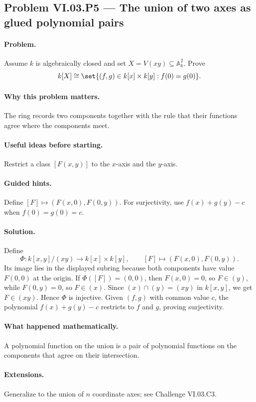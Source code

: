 \subsection*{Problem VI.03.P5 --- The union of two axes as glued polynomial pairs}
\label{prob:vi03-p5}
\paragraph{Problem.}
Assume \(k\) is algebraically closed and set \(X=V(xy)\subseteq\mathbb A_k^2\).  Prove
\[
k[X]\cong\set{(f,g)\in k[x]\times k[y]:f(0)=g(0)}.
\]
\ifdefined\FullProblemDossiers
\paragraph{Why this problem matters.} The ring records two components together with the rule that their functions agree where the components meet.
\paragraph{Useful ideas before starting.} Restrict a class \([F(x,y)]\) to the \(x\)-axis and the \(y\)-axis.
\paragraph{Guided hints.} Define \([F]\mapsto(F(x,0),F(0,y))\).  For surjectivity, use \(f(x)+g(y)-c\) when \(f(0)=g(0)=c\).
\paragraph{Solution.}
Define
\[
\Phi:k[x,y]/(xy)\to k[x]\times k[y],\qquad [F]\mapsto(F(x,0),F(0,y)).
\]
Its image lies in the displayed subring because both components have value \(F(0,0)\) at
the origin.  If \(\Phi([F])=(0,0)\), then \(F(x,0)=0\), so \(F\in(y)\), while
\(F(0,y)=0\), so \(F\in(x)\).  Since \((x)\cap(y)=(xy)\) in \(k[x,y]\), we get
\(F\in(xy)\).  Hence \(\Phi\) is injective.  Given \((f,g)\) with common value \(c\), the polynomial
\(f(x)+g(y)-c\) restricts to \(f\) and \(g\), proving surjectivity.
\paragraph{What happened mathematically.} A polynomial function on the union is a pair of polynomial functions on the components that agree on their intersection.
\paragraph{Extensions.} Generalize to the union of \(n\) coordinate axes; see Challenge VI.03.C3.
\fi
